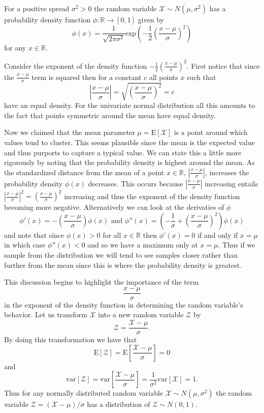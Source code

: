 \documentclass{book}
\newcommand{\e}[1]{\text{E}\left[#1\right]}
\begin{document}
For a positive spread $\sigma^2>0$ the random variable $\mathscr{X}\sim N(\mu,\sigma^2)$ has a probability density function $\phi :\mathbb{R}\rightarrow \left[0,1\right]$ given by 
$$
\phi(x)=\frac{1}{\sqrt{2\pi \sigma^2}}\text{exp}\left(-\frac{1}{2}\left(\frac{x-\mu}{\sigma}\right)^2\right)
$$
for any $x\in\mathbb{R}$. 

Consider the exponent of the density function $-\frac{1}{2}\left(\frac{x-\mu}{\sigma}\right)^2$. First notice that since the $\frac{x-\mu}{\sigma}$ term is squared then for a constant $c$ all points $x$ such that
$$
\left|\frac{x-\mu}{\sigma}\right|=\sqrt{\left(\frac{x-\mu}{\sigma}\right)^2}=c
$$
have an equal density. For the univariate normal distribution all this amounts to the fact that points symmetric around the mean have equal density. 

Now we claimed that the mean parameter $\mu=\e{\mathscr{X}}$ is a point around which values tend to cluster. This seems plausible since the mean is the expected value and thus purports to capture a typical value. We can state this a little more rigorously by noting that the probability density is highest around the mean.  As the standardized distance from the mean of a point $x\in\mathbb{R}$, $\left|\frac{x-\mu}{\sigma}\right|$, increases the probability density $\phi(x)$ decreases. This occurs because $\left|\frac{x-\mu}{\sigma}\right|$ increasing entails $\left|\frac{x-\mu}{\sigma}\right|^2=\left(\frac{x-\mu}{\sigma}\right)^2$ increasing and thus the exponent of the density function becoming more negative. Alternatively we can look at the derivaties of $\phi$ 
$$
\phi'(x)=-\left(\frac{x-\mu}{\sigma}\right)\phi(x)\text{ and }\phi''(x)=\left(-\frac{1}{\sigma}+\left(\frac{x-\mu}{\sigma}\right)^2\right)\phi(x)
$$
and note that since $\phi(x)>0$ for all $x\in\mathbb{R}$ then $\phi'(x)=0$ if and only if $x=\mu$ in which case $\phi''(x)<0$ and so we have a maximum only at $x=\mu$. Thus if we sample from the distribution we will tend to see samples closer rather than further from the mean since this is where the probability density is greatest. 


This discussion begins to highlight the importance of the term 
$$
\frac{x-\mu}{\sigma}
$$
in the exponent of the density function in determining the random variable's behavior. Let us transform $\mathscr{X}$ into a new random variable $\mathscr{Z}$ by
$$
\mathscr{Z}=\frac{\mathscr{X}-\mu}{\sigma}.
$$
By doing this transformation we have that
$$
\e{\mathscr{Z}}=\e{\frac{\mathscr{X}-\mu}{\sigma}}=0
$$
and
$$
\text{var}\left[\mathscr{Z}\right]=\text{var}\left[\frac{\mathscr{X}-\mu}{\sigma}\right]=\frac{1}{\sigma^2}\text{var}\left[\mathscr{X}\right]=1.
$$
Thus for any normally distributed random variable $\mathscr{X}\sim N(\mu,\sigma^2)$ the random variable $\mathscr{Z}=(\mathscr{X}-\mu)/\sigma$ has a distribution of $\mathscr{Z}\sim N(0,1)$. 
\end{document}
